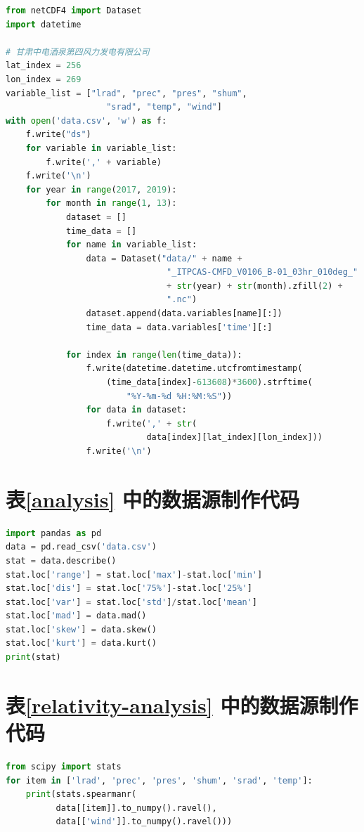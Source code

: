 \documentclass[AutoFakeBold]{LZUThesis}
\begin{document}
\begin{lstlisting}[language = python]
from netCDF4 import Dataset
import datetime

# 甘肃中电酒泉第四风力发电有限公司
lat_index = 256
lon_index = 269
variable_list = ["lrad", "prec", "pres", "shum",
                    "srad", "temp", "wind"]
with open('data.csv', 'w') as f:
    f.write("ds")
    for variable in variable_list:
        f.write(',' + variable)
    f.write('\n')
    for year in range(2017, 2019):
        for month in range(1, 13):
            dataset = []
            time_data = []
            for name in variable_list:
                data = Dataset("data/" + name + 
                                "_ITPCAS-CMFD_V0106_B-01_03hr_010deg_"
                                + str(year) + str(month).zfill(2) +
                                ".nc")
                dataset.append(data.variables[name][:])
                time_data = data.variables['time'][:]

            for index in range(len(time_data)):
                f.write(datetime.datetime.utcfromtimestamp(
                    (time_data[index]-613608)*3600).strftime(
                        "%Y-%m-%d %H:%M:%S"))
                for data in dataset:
                    f.write(',' + str(
                            data[index][lat_index][lon_index]))
                f.write('\n')
\end{lstlisting}

\section{表\ref{analysis} 中的数据源制作代码}

\begin{lstlisting}[language = python]
import pandas as pd
data = pd.read_csv('data.csv')
stat = data.describe()
stat.loc['range'] = stat.loc['max']-stat.loc['min']
stat.loc['dis'] = stat.loc['75%']-stat.loc['25%']
stat.loc['var'] = stat.loc['std']/stat.loc['mean']
stat.loc['mad'] = data.mad()
stat.loc['skew'] = data.skew()
stat.loc['kurt'] = data.kurt()
print(stat)
\end{lstlisting}

\section{表\ref{relativity-analysis} 中的数据源制作代码}

\begin{lstlisting}[language = python]
from scipy import stats
for item in ['lrad', 'prec', 'pres', 'shum', 'srad', 'temp']:
    print(stats.spearmanr(
          data[[item]].to_numpy().ravel(),
          data[['wind']].to_numpy().ravel()))
\end{lstlisting}
\end{document}
